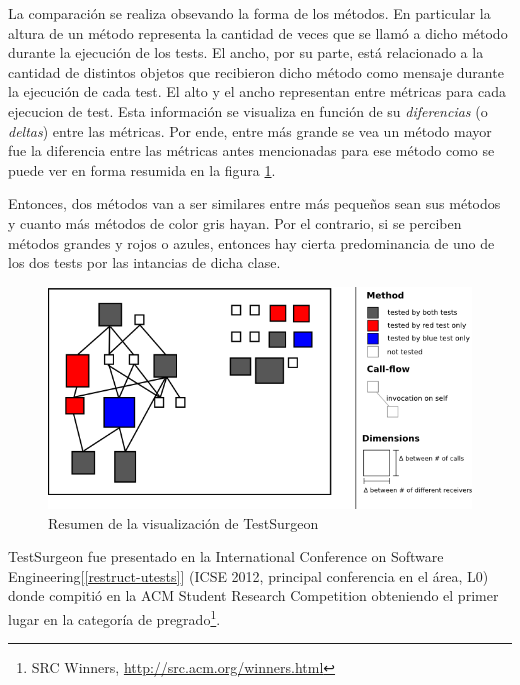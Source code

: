 \documentclass[12pt,spanish,letterpaper]{article}
\begin{document}
\par La comparación se realiza obsevando la forma de los métodos. 
En particular la altura de un método representa la cantidad de veces que se llamó a dicho método durante la ejecución de los tests. 
El ancho, por su parte, está relacionado a la cantidad de distintos objetos que recibieron dicho método como mensaje durante la ejecución de cada test. 
El alto y el ancho representan  entre métricas para cada ejecucion de test. 
Esta información se visualiza en función de su \emph{diferencias} (o \emph{deltas}) entre las métricas. Por ende, entre más grande se vea un método mayor fue la diferencia entre las métricas antes mencionadas para ese método como se puede ver en forma resumida en la figura \ref{blueprint-summary}. \\

\par Entonces, dos métodos van a ser similares entre más pequeños sean sus métodos y cuanto más métodos de color gris hayan. Por el contrario, si se perciben métodos grandes y rojos o azules, entonces hay cierta predominancia de uno de los dos tests por las intancias de dicha clase.

\begin{figure}[h!]
	\centering
    \includegraphics[scale=0.6]{blueprint-summary.png}
	\caption{Resumen de la visualización de TestSurgeon}
	\label{blueprint-summary}	
\end{figure}

\par TestSurgeon fue presentado en la International Conference on Software Engineering[\ref{restruct-utests}] (ICSE 2012, principal conferencia en el área, L0) donde compitió en la ACM Student Research Competition obteniendo el primer lugar en la categoría de pregrado\footnote{SRC Winners, \url{http://src.acm.org/winners.html}}.
\end{document}
